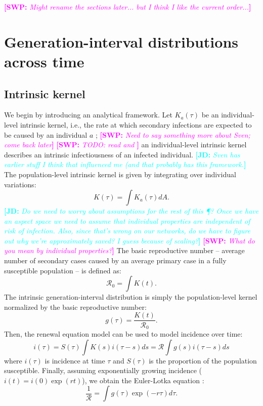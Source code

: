 \documentclass[12pt]{article}
\newcommand{\RR}{\ensuremath{{\mathcal R}}}
\newcommand{\comment}[3]{\textcolor{#1}{\textbf{[#2: }\textsl{#3}\textbf{]}}}
\newcommand{\jd}[1]{\comment{cyan}{JD}{#1}}
\newcommand{\swp}[1]{\comment{magenta}{SWP}{#1}}
\begin{document}
\swp{Might rename the sections later... but I think I like the current order...}
\section{Generation-interval distributions across time}

\subsection{Intrinsic kernel}

We begin by introducing an analytical framework.
Let $K_a(\tau)$ be an individual-level intrinsic kernel, i.e., the rate at which secondary infections are expected to be caused by an individual $a$ \citep{svensson2015influence}; \swp{Need to say something more about Sven; come back later}
\swp{TODO: read \cite{svensson2007note} and \cite{tomba2010some}}
an individual-level intrinsic kernel describes an intrinsic infectiousness of an infected individual.
\jd{Sven has earlier stuff I think that influenced me (and that probably has this framework.}
The population-level intrinsic kernel is given by integrating over individual variations:
\begin{equation}
K(\tau) = \int K_a (\tau) dA.
\end{equation}
\jd{Do we need to worry about assumptions for the rest of this \P? Once we have an aspect space we need to assume that individual properties are independent of risk of infection. Also, since that's wrong on our networks, do we have to figure out why we're approximately saved? I guess because of scaling?}
\swp{What do you mean by individual properties?}
The basic reproductive number -- average number of secondary cases caused by an average primary case in a fully susceptible population -- is defined as: 
\begin{equation}
\RR_0 = \int K(t).
\end{equation}
The intrinsic generation-interval distribution is simply the population-level kernel normalized by the basic reproductive number:
\begin{equation}
g(\tau) = \frac{K(t)}{\RR_0}.
\end{equation}
Then, the renewal equation model can be used to model incidence over time:
\begin{equation}
i(\tau) = S(\tau) \int K(s) i(\tau-s) ds = \RR \int g(s) i(\tau-s) ds
\end{equation}
where $i(\tau)$ is incidence at time $\tau$ and $S(\tau)$ is the proportion of the population susceptible.
Finally, assuming exponentially growing incidence ($i(t) = i(0) \exp(r t)$), we obtain the Euler-Lotka equation \citep{lotka1907relation}:
\begin{equation}
\frac{1}{\RR} = \int g(\tau) \exp(-r \tau) d\tau.
\end{equation}
\end{document}
